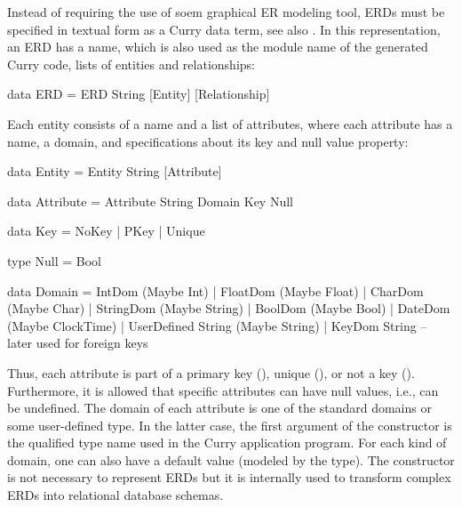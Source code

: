 Instead of requiring the use of soem graphical ER modeling tool,
ERDs must be specified in textual form as a Curry data term,
see also \cite{BrasselHanusMueller08PADL}.
In this representation, an ERD has a name, which is also used
as the module name of the generated Curry code,
lists of entities and relationships:
%
\begin{curry}
data ERD = ERD String [Entity] [Relationship]
\end{curry}
%
Each entity consists of a name and a list of attributes, where
each attribute has a name, a domain, and specifications
about its key and null value property:
\begin{curry}
data Entity = Entity String [Attribute]

data Attribute = Attribute String Domain Key Null

data Key = NoKey | PKey | Unique

type Null = Bool

data Domain = IntDom             (Maybe Int)
            | FloatDom           (Maybe Float)
            | CharDom            (Maybe Char)
            | StringDom          (Maybe String)
            | BoolDom            (Maybe Bool)
            | DateDom            (Maybe ClockTime)
            | UserDefined String (Maybe String)
            | KeyDom String   -- later used for foreign keys
\end{curry}
%
Thus, each attribute is part of a primary key (),
unique (), or not a key ().
Furthermore, it is allowed that specific attributes can have null values, i.e.,
can be undefined. The domain of each attribute is one of the standard
domains or some user-defined type. In the latter case, the
first argument of the constructor 
is the qualified type name used in the Curry application program.
For each kind of domain, one can also have a default value
(modeled by the  type).
The constructor  is not necessary to represent ERDs
but it is internally used to transform complex ERDs
into relational database schemas.

